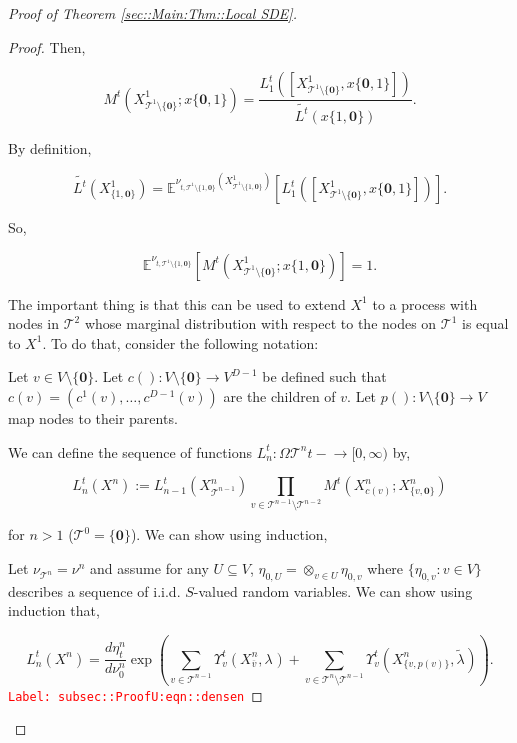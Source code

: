 \documentclass[12pt]{article}
\newcommand{\mb}{\mathbb}
\newcommand{\mc}{\mathcal}
\newcommand{\ra}{\rightarrow}
\newcommand{\ov}{\overline}
\newcommand{\tr}{\textcolor{red}}
\newcommand{\labe}[1]{\tr{\texttt{Label: #1}}}
\newcommand{\ind}{\hspace{24pt}}
\newcommand{\exmu}[2]{\mb{E}^{#1}\left[#2\right]}	%
\renewcommand{\root}{\mathbf{0}}				%
\renewcommand{\v}{v}							%
\renewcommand{\U}{U}							%
\renewcommand{\S}{S}							%
\newcommand{\x}{x}								%
\renewcommand{\t}{t}							%
\newcommand{\cl}{\ov}							%
\newcommand{\degr}{D}								%
\newcommand{\pup}[1]{^{#1}}							%
\newcommand{\tree}{\mc{T}}							%
\newcommand{\V}{V}									%
\newcommand{\numb}{n}								%
\newcommand{\rxvtsn}[3]{X_{#1}^{#3}{#2}}			%
\newcommand{\mm}[3]{\nu_{#2#1}^{#3}}						%
\newcommand{\mmm}[3]{\eta_{#2#1}^{#3}}						%
\newcommand{\rate}[1]{\lambda_{#1}}					%
\newcommand{\crate}[2]{\alt{\lambda}_{#1}^{#2}}		%
\newcommand{\alt}{\widetilde}						%
\newcommand{\dense}[2]{L_{#1}^{#2}}				%
\newcommand{\cdense}[2]{M_{#1}^{#2}}			%
\newcommand{\ds}[2]{\Upsilon_{#1}^{#2}}			%
\renewcommand{\c}[1]{c(#1)}						%
\newcommand{\p}[1]{p(#1)}						%
\begin{document}
\begin{proof}[Proof of Theorem \ref{sec::Main:Thm::Local SDE}]
\begin{proof}
Then,

\[\cdense{}{\t}(\rxvtsn{\tree\pup{1}\setminus\{\root\}}{}{1};\x{\{\root,1\}}{}) = \frac{\dense{1}{\t}([\rxvtsn{\tree\pup{1}\setminus\{\root\}}{}{1},\x{\{\root,1\}}{}])}{\alt{\dense{}{\t}}(\x{\{1,\root\}}{})}.\]

By definition,

\[\alt{\dense{}{\t}}(\rxvtsn{\{1,\root\}}{}{1}) = \exmu{\mm{\tree\pup{1}\setminus\{1,\root\}}{\t,}{}(\rxvtsn{\tree\pup{1}\setminus\{1,\root\}}{}{1})}{\dense{1}{\t}([\rxvtsn{\tree\pup{1}\setminus\{\root\}}{}{1},\x{\{\root,1\}}{}])}.\]

So,

\[\exmu{\mm{\tree\pup{1}\setminus\{1,\root\}}{\t,}{}}{\cdense{}{\t}(\rxvtsn{\tree\pup{1}\setminus\{\root\}}{}{1};\x{\{1,\root\}}{})} = 1.\]

The important thing is that this can be used to extend \(\rxvtsn{}{}{1}\) to a process with nodes in \(\tree\pup{2}\) whose marginal distribution with respect to the nodes on \(\tree\pup{1}\) is equal to \(\rxvtsn{}{}{1}\). To do that, consider the following notation:

\ind Let \(\v \in \V\setminus\{\root\}\). Let \(\c{}:\V\setminus\{\root\} \ra \V^{\degr-1}\) be defined such that \(\c{\v} = (c^1(\v),\dots,c^{\degr-1}(\v))\) are the children of \(\v\). Let \(\p{}:\V\setminus\{\root\}\ra\V\) map nodes to their parents.

\ind We can define the sequence of functions \(\dense{\numb}{\t}: \Omega{\tree\pup{\numb}}{\t-} \ra [0,\infty)\) by,

\[\dense{\numb}{\t}(\rxvtsn{}{}{\numb}) := \dense{\numb-1}{\t}(\rxvtsn{\tree\pup{\numb-1}}{}{\numb})\prod_{\v\in \tree\pup{\numb-1}\setminus\tree\pup{\numb-2}} \cdense{}{\t}(\rxvtsn{\c{\v}}{}{\numb};\rxvtsn{\{\v,\root\}}{}{\numb})\]

for \(\numb > 1\) (\(\tree\pup{0} = \{\root\}\)). We can show using induction,

\ind Let \(\mm{\tree\pup{\numb}}{}{} = \mm{}{}{\numb}\) and assume for any \(\U \subseteq \V\), \(\mmm{\U}{0,}{} = \otimes_{\v\in\U}\mmm{\v}{0,}{}\) where \(\{\mmm{\v}{0,}{}:\v\in\V\}\) describes a sequence of i.i.d. \(\S\)-valued random variables. We can show using induction that,

\begin{equation}
\dense{\numb}{\t}(\rxvtsn{}{}{\numb}) = \frac{d\mmm{}{\t}{\numb}}{d\mm{}{0}{\numb}}\exp\left(\sum_{\v\in\tree\pup{\numb-1}}\ds{\v}{\t}(\rxvtsn{\cl{\v}}{}{\numb},\rate{}) + \sum_{\v\in\tree\pup{\numb}\setminus\tree\pup{\numb-1}} \ds{\v}{\t}(\rxvtsn{\{v,\p{\v}\}}{}{\numb},\crate{}{})\right).
\label{subsec::ProofU:eqn::densen}
\end{equation}
\labe{subsec::ProofU:eqn::densen}


\end{proof}
\end{proof}
\end{document}
